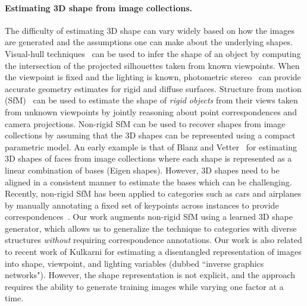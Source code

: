 \paragraph*{Estimating 3D shape from image collections.} 
The difficulty of estimating 3D shape can vary widely based on how the
images are generated and the assumptions one can make about the underlying
shapes.
Visual-hull techniques~\cite{laurentini1994visual} can be used to
infer the shape of an object by computing the intersection of the
projected silhouettes taken from known viewpoints. 
When the viewpoint is fixed and the lighting is known, photometric
stereo~\cite{woodham1980photometric} can provide accurate geometry
estimates for rigid and diffuse surfaces.
Structure from motion (SfM)~\cite{hartley2003multiple} can be used to
estimate the shape of \emph{rigid objects} from their views taken from
unknown viewpoints by jointly reasoning about point correspondences
and camera projections. 
Non-rigid SfM can be used to recover shapes from image collections by
assuming that the 3D shapes can be represented using a compact parametric model.
An early example is that of Blanz and Vetter~\cite{blanz1999morphable} for
estimating 3D shapes of faces from image collections where each shape
is represented as a linear combination of bases (Eigen shapes). 
However, 3D shapes need to be aligned in a
consistent manner to estimate the bases which can be challenging.
Recently, non-rigid SfM has been applied to categories such as cars
and airplanes by manually annotating a fixed set of keypoints across
instances to provide correspondences~\cite{kar2015category}.
Our work augments non-rigid SfM using a learned 3D shape generator,
which allows us to generalize the technique to categories with diverse
structures \emph{without} requiring correspondence annotations.
Our work is also related to recent work of Kulkarni
\etal \cite{kulkarni2015deep} for estimating a disentangled
representation of images into shape, viewpoint, and lighting variables
(dubbed ``inverse graphics networks"). However, the shape
representation is not explicit, and the approach requires the ability
to generate training images while varying one factor at a time.

